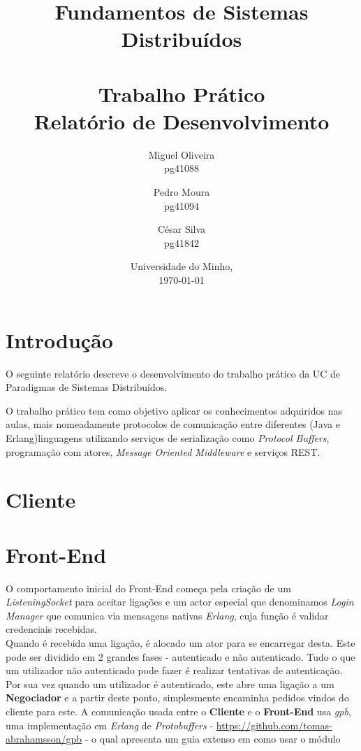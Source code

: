\documentclass[12pt, a4paper]{report}
\begin{document}
\title{
    Fundamentos de Sistemas Distribuídos\\
    \textbf{\\Trabalho Prático}
    \large{\\Relatório de Desenvolvimento}
}

\author{
    Miguel Oliveira\\ pg41088
    \and Pedro Moura\\ pg41094
    \and César Silva\\ pg41842
}
\date{Universidade do Minho,\\\today}

\maketitle

\tableofcontents

\chapter{Introdução}
O seguinte relatório descreve o desenvolvimento do trabalho prático da UC de Paradigmas de Sistemas Distribuídos.

O trabalho prático tem como objetivo aplicar os conhecimentos adquiridos nas aulas, mais nomeadamente protocolos de comunicação entre diferentes  (Java e Erlang)linguagens utilizando serviços de serialização como \textit{Protocol Buffers}, programação com atores, \textit{Message Oriented Middleware} e serviços REST.


\chapter{Cliente}

\chapter{Front-End}

O comportamento inicial do Front-End começa pela criação de um
\textit{ListeningSocket} para aceitar ligações e um actor especial que 
denominamos \textit{Login Manager} que comunica via mensagens nativas
\textit{Erlang}, cuja função é validar credenciais recebidas. \\
Quando é recebida uma ligação, é alocado um ator para se encarregar desta.
Este pode ser dividido em 2 grandes fases - autenticado e não autenticado.
Tudo o que um utilizador não autenticado pode fazer é realizar tentativas de
autenticação. Por sua vez quando um utilizador é autenticado, este abre uma
ligação a um \textbf{Negociador} e a partir deste ponto, simplesmente encaminha
pedidos vindos do cliente para este. A comunicação usada entre
o \textbf{Cliente} e o \textbf{Front-End} usa \textit{gpb}, uma implementação em
\textit{Erlang} de \textit{Protobuffers}
- \url{https://github.com/tomas-abrahamsson/gpb} - o qual apresenta um guia
extenso em como usar o módulo
\end{document}
